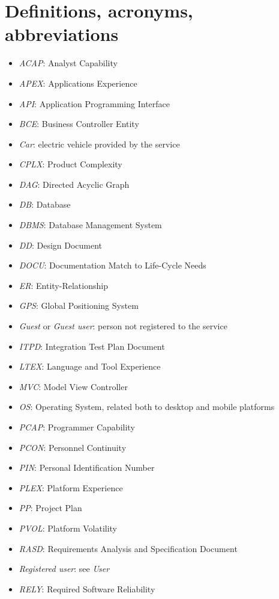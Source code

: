 \section{Definitions, acronyms, abbreviations}
\begin{itemize}
	\item \emph{ACAP}: Analyst Capability
	\item \emph{APEX}: Applications Experience
	\item \emph{API}: Application Programming Interface
	\item \emph{BCE}: Business Controller Entity
	\item \emph{Car}: electric vehicle provided by the service
	\item \emph{CPLX}: Product Complexity
	\item \emph{DAG}: Directed Acyclic Graph
	\item \emph{DB}: Database
	\item \emph{DBMS}: Database Management System
	\item \emph{DD}: Design Document
	\item \emph{DOCU}: Documentation Match to Life-Cycle Needs
	\item \emph{ER}: Entity-Relationship
	\item \emph{GPS}: Global Positioning System
	\item \emph{Guest} or \emph{Guest user}: person not registered to the service
	\item \emph{ITPD}: Integration Test Plan Document
	\item \emph{LTEX}: Language and Tool Experience
	\item \emph{MVC}: Model View Controller
	\item \emph{OS}: Operating System, related both to desktop and mobile platforms
	\item \emph{PCAP}: Programmer Capability
	\item \emph{PCON}: Personnel Continuity
	\item \emph{PIN}: Personal Identification Number
	\item \emph{PLEX}: Platform Experience
	\item \emph{PP}: Project Plan
	\item \emph{PVOL}: Platform Volatility
	\item \emph{RASD}: Requirements Analysis and Specification Document
	\item \emph{Registered user}: see \emph{User}
	\item \emph{RELY}: Required Software Reliability

\end{itemize}
